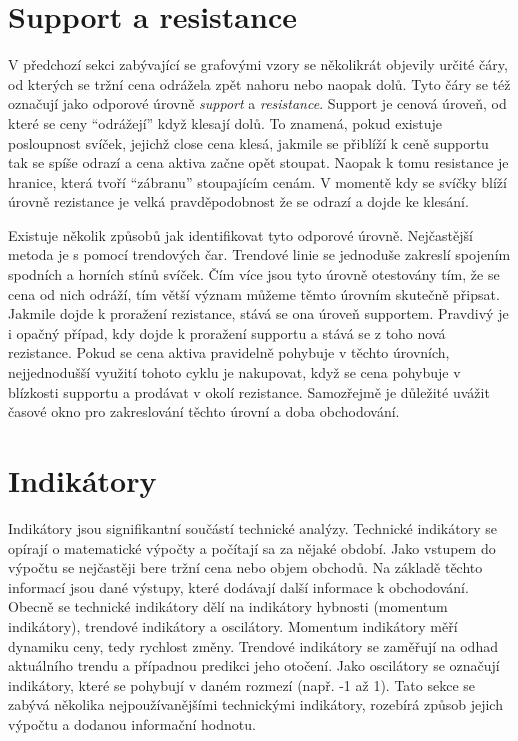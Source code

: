 \section{Support a resistance}
\label{sec:TrendingLines}
V předchozí sekci zabývající se grafovými vzory se několikrát objevily určité čáry, od kterých se tržní cena odrážela zpět nahoru nebo naopak dolů. Tyto čáry se též označují jako odporové
úrovně \emph{support} a \emph{resistance}. Support je cenová úroveň, od které se ceny \enquote{odrážejí} když klesají dolů. To znamená, pokud existuje posloupnost svíček, jejichž close cena
klesá, jakmile se přiblíží k ceně supportu tak se spíše odrazí a cena aktiva začne opět stoupat. Naopak k tomu resistance je hranice, která tvoří \enquote{zábranu} stoupajícím cenám.
V momentě kdy se svíčky blíží úrovně rezistance je velká pravděpodobnost že se odrazí a dojde ke klesání.

Existuje několik způsobů jak identifikovat tyto odporové úrovně. Nejčastější metoda je s pomocí trendových čar. Trendové linie se jednoduše zakreslí spojením spodních a horních stínů svíček.
Čím více jsou tyto úrovně otestovány tím, že se cena od nich odráží, tím větší význam můžeme těmto úrovním skutečně připsat. Jakmile dojde k proražení rezistance, stává se ona úroveň
supportem. Pravdivý je i opačný případ, kdy dojde k proražení supportu a stává se z toho nová rezistance.
Pokud se cena aktiva pravidelně pohybuje v těchto úrovních, nejjednodušší využití tohoto cyklu je nakupovat, když se cena pohybuje v blízkosti supportu a prodávat v okolí rezistance.
Samozřejmě je důležité uvážit časové okno pro zakreslování těchto úrovní a doba obchodování.

\section{Indikátory}
\label{sec:Indicators}
Indikátory jsou signifikantní součástí technické analýzy. Technické indikátory se opírají o matematické výpočty a počítají sa za nějaké období. Jako vstupem do výpočtu se nejčastěji
bere tržní cena nebo objem obchodů. Na základě těchto informací jsou dané výstupy, které dodávají další informace k obchodování.
Obecně se technické indikátory dělí na indikátory hybnosti (momentum indikátory), trendové indikátory a oscilátory. Momentum indikátory měří dynamiku ceny, tedy rychlost změny.
Trendové indikátory se zaměřují na odhad aktuálního trendu a případnou predikci jeho otočení. Jako oscilátory se označují indikátory, které se pohybují v daném rozmezí (např. -1 až 1).
Tato sekce se zabývá několika nejpoužívanějšími technickými indikátory, rozebírá způsob jejich výpočtu a dodanou informační hodnotu.

